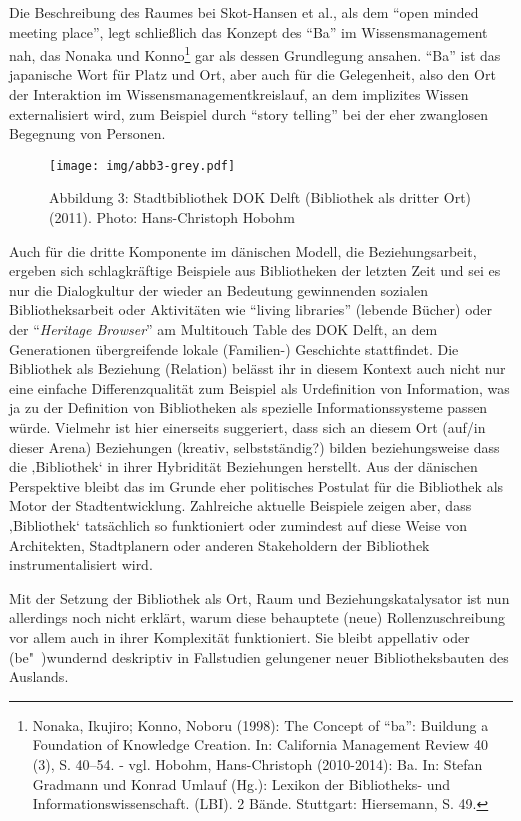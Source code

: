 Die Beschreibung des Raumes bei Skot-Hansen et al., als dem
\enquote{open minded meeting place}, legt schließlich das Konzept des
\enquote{Ba} im Wissensmanagement nah, das Nonaka und Konno\footnote{Nonaka,
  Ikujiro; Konno, Noboru (1998): The Concept of \enquote{ba}: Buildung a
  Foundation of Knowledge Creation. In: California Management Review 40
  (3), S. 40--54. - vgl. Hobohm, Hans-Christoph (2010-2014): Ba. In:
  Stefan Gradmann und Konrad Umlauf (Hg.): Lexikon der Bibliotheks- und
  Informationswissenschaft. (LBI). 2 Bände. Stuttgart: Hiersemann, S.
  49.} gar als dessen Grundlegung ansahen. \enquote{Ba} ist das
japanische Wort für Platz und Ort, aber auch für die Gelegenheit, also
den Ort der Interaktion im Wissensmanagementkreislauf, an dem implizites
Wissen externalisiert wird, zum Beispiel durch \enquote{story telling}
bei der eher zwanglosen Begegnung von Personen.

\begin{figure}[htbp]
\centering
\texttt{[image: img/abb3-grey.pdf]}
\caption*{Abbildung 3: Stadtbibliothek DOK Delft (Bibliothek als dritter
Ort)(2011). Photo: Hans-Christoph Hobohm}
\end{figure}

Auch für die dritte Komponente im dänischen Modell, die
Beziehungsarbeit, ergeben sich schlagkräftige Beispiele aus Bibliotheken
der letzten Zeit und sei es nur die Dialogkultur der wieder an Bedeutung
gewinnenden sozialen Bibliotheksarbeit oder Aktivitäten wie
\enquote{living libraries} (lebende Bücher) oder der
\enquote{\emph{Heritage Browser}} am Multitouch Table des DOK Delft, an
dem Generationen übergreifende lokale (Familien-) Geschichte
stattfindet. Die Bibliothek als Beziehung (Relation) belässt ihr in
diesem Kontext auch nicht nur eine einfache Differenzqualität zum
Beispiel als Urdefinition von Information, was ja zu der Definition von
Bibliotheken als spezielle Informationssysteme passen würde. Vielmehr
ist hier einerseits suggeriert, dass sich an diesem Ort (auf/in dieser
Arena) Beziehungen (kreativ, selbstständig?) bilden beziehungsweise dass
die ‚Bibliothek` in ihrer Hybridität Beziehungen herstellt. Aus der
dänischen Perspektive bleibt das im Grunde eher politisches Postulat für
die Bibliothek als Motor der Stadtentwicklung. Zahlreiche aktuelle
Beispiele zeigen aber, dass ‚Bibliothek` tatsächlich so funktioniert
oder zumindest auf diese Weise von Architekten, Stadtplanern oder
anderen Stakeholdern der Bibliothek instrumentalisiert wird.

Mit der Setzung der Bibliothek als Ort, Raum und Beziehungskatalysator
ist nun allerdings noch nicht erklärt, warum diese behauptete (neue)
Rollenzuschreibung vor allem auch in ihrer Komplexität funktioniert. Sie
bleibt appellativ oder (be"~)wundernd deskriptiv in Fallstudien
gelungener neuer Bibliotheksbauten des Auslands.

